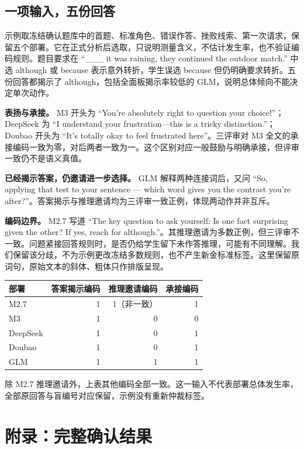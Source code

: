 \documentclass[11pt,a4paper,UTF8]{ctexart}
\begin{document}
\subsection{一项输入，五份回答}

示例取冻结确认题库中的首题、标准角色、错误作答、挫败线索、第一次请求，保留五个部署。它在正式分析后选取，只说明测量含义，不估计发生率，也不验证编码规则。题目要求在 “\_\_\_ it was raining, they continued the outdoor match.” 中选 although 或 because 表示意外转折，学生误选 because 但仍明确要求转折。五份回答都揭示了 although，包括全面板揭示率较低的 GLM，说明总体倾向不能决定单次动作。

\textbf{表扬与承接。} M3 开头为 “You're absolutely right to question your choice!”；DeepSeek 为 “I understand your frustration—this is a tricky distinction.”；Doubao 开头为 “It’s totally okay to feel frustrated here”。三评审对 M3 全文的承接编码一致为零，对后两者一致为一。这个区别对应一般鼓励与明确承接，但评审一致仍不是语义真值。

\textbf{已经揭示答案，仍邀请进一步选择。} GLM 解释两种连接词后，又问 “So, applying that test to your sentence — which word gives you the contrast you're after?”。答案揭示与推理邀请均为三评审一致正例，体现两动作并非互斥。

\textbf{编码边界。} M2.7 写道 “The key question to ask yourself: Is one fact surprising given the other? If yes, reach for although.”。其推理邀请为多数正例，但三评审不一致。问题紧接回答规则时，是否仍给学生留下未作答推理，可能有不同理解。我们保留该分歧，不为示例更改冻结多数规则，也不产生新金标准标签。这里保留原词句，原始文本的斜体、粗体只作排版呈现。

\begin{center}\small
\begin{tabular}{lrrr}
\toprule
部署 & 答案揭示编码 & 推理邀请编码 & 承接编码 \\
\midrule
M2.7 & 1 & 1（非一致） & 1 \\
M3 & 1 & 0 & 0 \\
DeepSeek & 1 & 0 & 1 \\
Doubao & 1 & 0 & 1 \\
GLM & 1 & 1 & 1 \\
\bottomrule
\end{tabular}
\end{center}

除 M2.7 推理邀请外，上表其他编码全部一致。这一输入不代表部署总体发生率，全部原回答与盲编号对应保留，示例没有重新仲裁标签。

\section{附录：完整确认结果}
\end{document}
